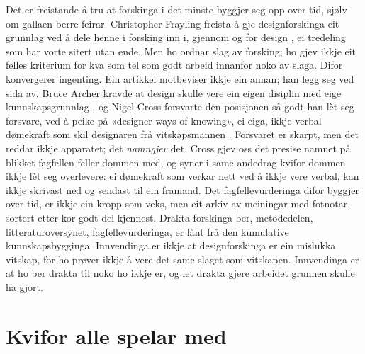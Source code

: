 Det er freistande å tru at forskinga i det minste byggjer seg opp over tid, sjølv om gallaen berre feirar. Christopher Frayling freista å gje designforskinga eit grunnlag ved å dele henne i forsking inn i, gjennom og for design \autocite{frayling1993}, ei tredeling som har vorte sitert utan ende. Men ho ordnar slag av forsking; ho gjev ikkje eit felles kriterium for kva som tel som godt arbeid innanfor noko av slaga. Difor konvergerer ingenting. Ein artikkel motbeviser ikkje ein annan; han legg seg ved sida av. Bruce Archer kravde at design skulle vere ein eigen disiplin med eige kunnskapsgrunnlag \autocite{archer1979discipline}, og Nigel Cross forsvarte den posisjonen så godt han lèt seg forsvare, ved å peike på «designer ways of knowing», ei eiga, ikkje-verbal dømekraft som skil designaren frå vitskapsmannen \autocite{cross2006}. Forsvaret er skarpt, men det reddar ikkje apparatet; det \emph{namngjev} det. Cross gjev oss det presise namnet på blikket fagfellen feller dommen med, og syner i same andedrag kvifor dommen ikkje lèt seg overlevere: ei dømekraft som verkar nett ved å ikkje vere verbal, kan ikkje skrivast ned og sendast til ein framand. Det fagfellevurderinga difor byggjer over tid, er ikkje ein kropp som veks, men eit arkiv av meiningar med fotnotar, sortert etter kor godt dei kjennest. Drakta forskinga ber, metodedelen, litteraturoversynet, fagfellevurderinga, er lånt frå den kumulative kunnskapsbygginga. Innvendinga er ikkje at designforskinga er ein mislukka vitskap, for ho prøver ikkje å vere det same slaget som vitskapen. Innvendinga er at ho ber drakta til noko ho ikkje er, og let drakta gjere arbeidet grunnen skulle ha gjort.

\section{Kvifor alle spelar med}

